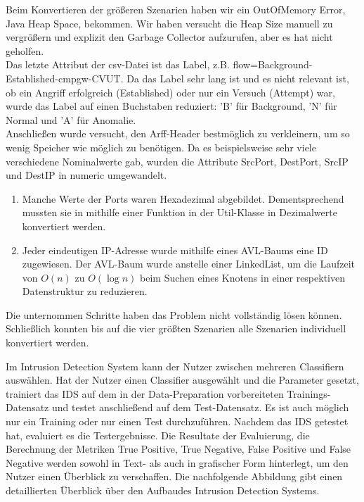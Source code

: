 \documentclass[main.tex]{subfiles}
\begin{document}
Beim Konvertieren der größeren Szenarien haben wir ein OutOfMemory Error, Java Heap Space, bekommen. Wir haben versucht die Heap Size manuell zu vergrößern und explizit den Garbage Collector aufzurufen, aber es hat nicht geholfen.\\

Das letzte Attribut der csv-Datei ist das Label, z.B. flow=Background-Established-cmpgw-CVUT. 
Da das Label sehr lang ist und es nicht relevant ist, ob ein Angriff erfolgreich (Established) oder nur ein Versuch (Attempt) war, wurde das Label auf einen Buchstaben reduziert: 'B' für Background, 'N' für Normal und 'A' für Anomalie.\\

Anschließen wurde versucht, den Arff-Header bestmöglich zu verkleinern,  um so wenig Speicher wie möglich zu benötigen.
Da es beispielsweise sehr viele verschiedene Nominalwerte gab, wurden die Attribute SrcPort, DestPort, SrcIP und DestIP in numeric umgewandelt. \\

\begin{center}
\begin{enumerate}
\item Manche Werte der Ports waren Hexadezimal abgebildet. Dementsprechend mussten sie in mithilfe einer Funktion in der Util-Klasse in Dezimalwerte konvertiert werden.
\item Jeder eindeutigen IP-Adresse wurde mithilfe eines AVL-Baums eine ID zugewiesen. Der AVL-Baum wurde anstelle einer LinkedList, um die Laufzeit von $O(n)$ zu $O(\log{n})$ beim Suchen eines Knotens in einer respektiven Datenstruktur zu reduzieren.
\end{enumerate}
\end{center}
Die unternommen Schritte haben das Problem nicht vollständig lösen können. Schließlich konnten bis auf die vier größten Szenarien alle Szenarien individuell konvertiert werden.


Im Intrusion Detection System kann der Nutzer zwischen mehreren Classifiern auswählen. Hat der Nutzer einen Classifier ausgewählt und die Parameter gesetzt, trainiert das IDS auf dem in der Data-Preparation vorbereiteten Trainings-Datensatz und testet anschließend auf dem Test-Datensatz. Es ist auch möglich nur ein Training oder nur einen Test durchzuführen. Nachdem das IDS getestet hat, evaluiert es die Testergebnisse. Die Resultate der Evaluierung, die Berechnung der Metriken True Positive, True Negative, False Positive und False Negative werden sowohl in Text- als auch in grafischer Form hinterlegt, um den Nutzer einen Überblick zu verschaffen. 
Die nachfolgende Abbildung gibt einen detaillierten Überblick über den Aufbaudes Intrusion Detection Systems. \\
\end{document}
